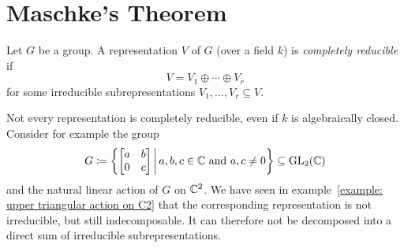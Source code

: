 \section{Maschke’s Theorem}


\begin{definition}
  Let $G$ be a group.
  A representation $V$ of $G$ (over a field $k$) is \emph{completely reducible} if
  \[
      V
    = V_1 \oplus \dotsb \oplus V_r
  \]
  for some irreducible subrepresentations $V_1, \dotsc, V_r \subseteq V$.
\end{definition}


\begin{remark}
  Not every representation is completely reducible, even if $k$ is algebraically closed.
  Consider for example the group
  \[
    G
    \defined \left\{
                \begin{bmatrix}
                  a & b \\
                  0 & c
                \end{bmatrix}
              \suchthat*
                \text{$a, b, c \in \Complex$ and $a,c \neq 0$}
              \right\}
    \subseteq \GL_2(\Complex)
  \]
  and the natural linear action of $G$ on $\mathbb{C}^2$.
  We have seen in example~\ref{example: upper triangular action on C2} that the corresponding representation is not irreducible, but still indecomposable.
  It can therefore not be decomposed into a direct sum of irreducible subrepresentations.
\end{remark}


